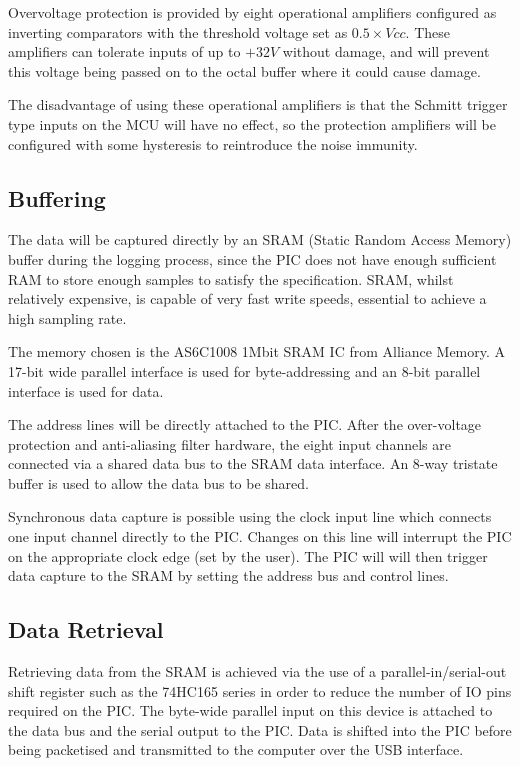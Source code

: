 \documentclass[11pt]{article}
\begin{document}
    Overvoltage protection is provided by eight operational amplifiers
    configured as inverting comparators with the threshold voltage set as
    $0.5 \times Vcc$. These amplifiers can tolerate inputs of up to $+32V$ without damage, and
    will prevent this voltage being passed on to the octal buffer where it could
    cause damage.

    The disadvantage of using these operational amplifiers is that the Schmitt trigger type inputs on the MCU will have no effect, so the protection amplifiers will be
    configured with some hysteresis to reintroduce the noise immunity.

\subsection{Buffering}
    The data will be captured directly by an SRAM (Static Random Access Memory) buffer during the logging process, since the PIC does not have enough sufficient RAM to store enough samples to satisfy the specification. SRAM, whilst relatively expensive, is capable of very fast write speeds, essential to achieve a high sampling rate.

    The memory chosen is the AS6C1008 1Mbit SRAM IC from Alliance Memory. A 17-bit wide parallel interface is used for byte-addressing and an 8-bit parallel interface is used for data.

    The address lines will be directly attached to the PIC. After the over-voltage protection and anti-aliasing filter hardware, the eight input channels are connected via a shared data bus to the SRAM data interface. An 8-way tristate buffer is used to allow the data bus to be shared.
    
    Synchronous data capture is possible using the clock input line which connects one input channel directly to the PIC. Changes on this line will interrupt the PIC on the appropriate clock edge (set by the user).  The PIC will will then trigger data capture to the SRAM by setting the address bus and control lines.

\subsection{Data Retrieval}
    Retrieving data from the SRAM is achieved via the use of a parallel-in/serial-out shift register such as the 74HC165 series in order to reduce the number of IO pins required on the PIC. The byte-wide parallel input on this device is attached to the data bus and the serial output to the PIC. Data is shifted into the PIC before being packetised and transmitted to the computer over the USB interface.
\end{document}
